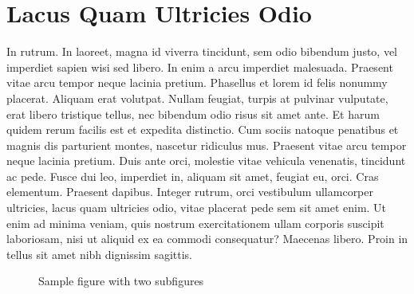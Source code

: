 \section{Lacus Quam Ultricies Odio}
In rutrum. In laoreet, magna id viverra tincidunt, sem odio bibendum justo, vel imperdiet sapien wisi sed libero. In enim a arcu imperdiet malesuada. Praesent vitae arcu tempor neque lacinia pretium. Phasellus et lorem id felis nonummy placerat. Aliquam erat volutpat. Nullam feugiat, turpis at pulvinar vulputate, erat libero tristique tellus, nec bibendum odio risus sit amet ante. Et harum quidem rerum facilis est et expedita distinctio. Cum sociis natoque penatibus et magnis dis parturient montes, nascetur ridiculus mus. Praesent vitae arcu tempor neque lacinia pretium. Duis ante orci, molestie vitae vehicula venenatis, tincidunt ac pede. Fusce dui leo, imperdiet in, aliquam sit amet, feugiat eu, orci. Cras elementum. Praesent dapibus. Integer rutrum, orci vestibulum ullamcorper ultricies, lacus quam ultricies odio, vitae placerat pede sem sit amet enim. Ut enim ad minima veniam, quis nostrum exercitationem ullam corporis suscipit laboriosam, nisi ut aliquid ex ea commodi consequatur? Maecenas libero. Proin in tellus sit amet nibh dignissim sagittis.

\begin{figure}
	\centering
	\hspace{3em} %
	\caption{Sample figure with two subfigures}
	\label{fig:TopLevelFigureLabel}
\end{figure}

